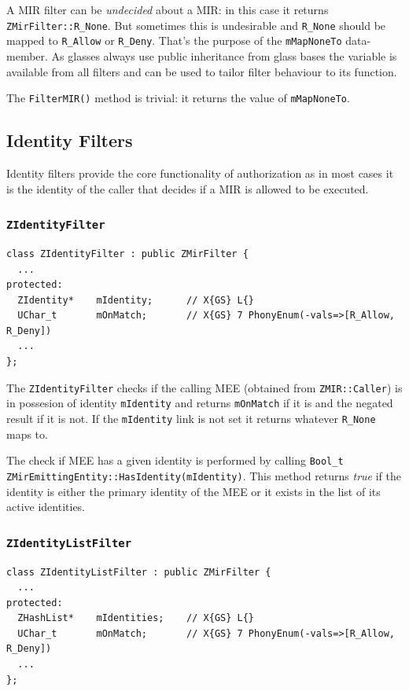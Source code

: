 \documentclass[a4paper,11pt]{article}
\def\smalltt#1{{\small\texttt{#1}}}
\begin{document}
A MIR filter can be \emph{undecided} about a MIR: in this case it
returns \smalltt{ZMirFilter::R\_None}. But sometimes this is
undesirable and \smalltt{R\_None} should be mapped to
\smalltt{R\_Allow} or \smalltt{R\_Deny}. That's the purpose of the
\smalltt{mMapNoneTo} data-member. As glasses always use public
inheritance from glass bases the variable is available from all
filters and can be used to tailor filter behaviour to its function.

The \smalltt{FilterMIR()} method is trivial: it returns the value of
\smalltt{mMapNoneTo}.


\subsection{Identity Filters}

Identity filters provide the core functionality of authorization as
in most cases it is the identity of the caller that decides if a
MIR is allowed to be executed.

\subsubsection{\texttt{ZIdentityFilter}}

{\footnotesize\begin{verbatim}
class ZIdentityFilter : public ZMirFilter {
  ...
protected:
  ZIdentity*    mIdentity;      // X{GS} L{}
  UChar_t       mOnMatch;       // X{GS} 7 PhonyEnum(-vals=>[R_Allow, R_Deny])
  ...
};
\end{verbatim}
}

The \smalltt{ZIdentityFilter} checks if the calling MEE (obtained from
\smalltt{ZMIR::Caller}) is in possesion of identity
\smalltt{mIdentity} and returns \smalltt{mOnMatch} if it is and the
negated result if it is not. If the \smalltt{mIdentity} link is not
set it returns whatever \smalltt{R\_None} maps to.

The check if MEE has a given identity is performed by calling
\smalltt{Bool\_t\- ZMirEmittingEntity::\-HasIdentity(mIdentity)}. This
method returns \emph{true} if the identity is either the primary
identity of the MEE or it exists in the list of its active identities.


\subsubsection{\texttt{ZIdentityListFilter}}

{\footnotesize\begin{verbatim}
class ZIdentityListFilter : public ZMirFilter {
  ...
protected:
  ZHashList*    mIdentities;    // X{GS} L{}
  UChar_t       mOnMatch;       // X{GS} 7 PhonyEnum(-vals=>[R_Allow, R_Deny])
  ...
};
\end{verbatim}
}
\end{document}
